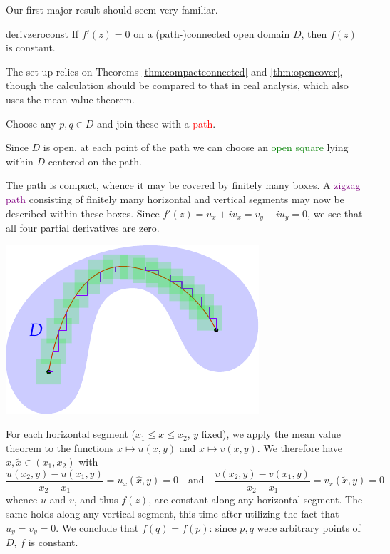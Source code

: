 Our first major result should seem very familiar.

\begin{thm}{}{derivzeroconst}
If $f'(z)=0$ on a (path-)connected open domain $D$, then $f(z)$ is constant.  
\end{thm}

The set-up relies on Theorems \ref{thm:compactconnected} and \ref{thm:opencover}, though the calculation should be compared to that in real analysis, which also uses the mean value theorem.

\begin{tcolorbox}[proofstyle]
\begin{minipage}[t]{0.6\linewidth}\vspace{0pt}
Choose any $p,q\in D$ and join these with a \textcolor{red}{path}.\par Since $D$ is open, at each point of the path we can choose an \textcolor{Green}{open square} lying within $D$ centered on the path.\par
The path is compact, whence it may be covered by finitely many boxes. A \textcolor{purple}{zigzag path} consisting of finitely many horizontal and vertical segments may now be described within these boxes.\smallbreak
Since $f'(z)=u_x+iv_x=v_y-iu_y=0$, we see that all four partial derivatives are zero.
\end{minipage}\begin{minipage}[t]{0.4\linewidth}\vspace{0pt}
\flushright\includegraphics{analytic-topology}
\end{minipage}\medbreak
For each horizontal segment ($x_1\le x\le x_2$, $y$ fixed), we apply the mean value theorem to the functions $x\mapsto u(x,y)$ and $x\mapsto v(x,y)$. We therefore have $\widehat x,\widetilde x\in (x_1,x_2)$ with
\[\frac{u(x_2,y)-u(x_1,y)}{x_2-x_1}=u_x(\widehat x,y)=0\quad\text{and}\quad \frac{v(x_2,y)-v(x_1,y)}{x_2-x_1}=v_x(\widetilde x,y)=0\]
whence $u$ and $v$, and thus $f(z)$, are constant along any horizontal segment.\smallbreak
The same holds along any vertical segment, this time after utilizing the fact that $u_y=v_y=0$.\smallbreak
 We conclude that $f(q)=f(p)$: since $p,q$ were arbitrary points of $D$, $f$ is constant.\hfill\qedsymbol
\end{tcolorbox}
\goodbreak

